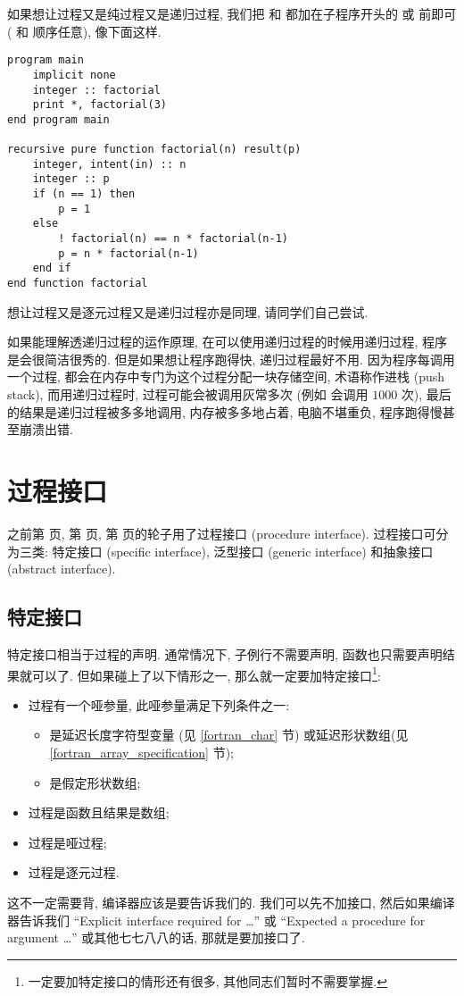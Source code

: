 如果想让过程又是纯过程又是递归过程, 我们把  和  都加在子程序开头的  或  前即可 ( 和  顺序任意), 像下面这样.
\begin{lstlisting}
program main
    implicit none
    integer :: factorial
    print *, factorial(3)
end program main

recursive pure function factorial(n) result(p)
    integer, intent(in) :: n
    integer :: p
    if (n == 1) then
        p = 1
    else
        ! factorial(n) == n * factorial(n-1)
        p = n * factorial(n-1)
    end if
end function factorial
\end{lstlisting}
想让过程又是逐元过程又是递归过程亦是同理, 请同学们自己尝试.

如果能理解透递归过程的运作原理, 在可以使用递归过程的时候用递归过程, 程序是会很简洁很秀的. 但是如果想让程序跑得快, 递归过程最好不用. 因为程序每调用一个过程, 都会在内存中专门为这个过程分配一块存储空间, 术语称作进栈 (push stack), 而用递归过程时, 过程可能会被调用灰常多次 (例如  会调用  $1000$ 次), 最后的结果是递归过程被多多地调用, 内存被多多地占着, 电脑不堪重负, 程序跑得慢甚至崩溃出错.

\section{过程接口} \label{fortran_interface} 

之前第 \pageref{assumed-shape_array_program} 页, 第 \pageref{dummy_procedure_program} 页, 第 \pageref{elemental_procedure_program} 页的轮子用了过程接口 (procedure interface). 过程接口可分为三类: 特定接口 (specific interface), 泛型接口 (generic interface) 和抽象接口 (abstract interface). 

\subsection{特定接口} 

特定接口相当于过程的声明. 通常情况下, 子例行不需要声明, 函数也只需要声明结果就可以了. 但如果碰上了以下情形之一, 那么就一定要加特定接口\footnote{一定要加特定接口的情形还有很多, 其他同志们暂时不需要掌握.}:\label{whether_specific_interface}
\begin{itemize} 
    \item 过程有一个哑参量, 此哑参量满足下列条件之一: \begin{itemize} 
        \item 是延迟长度字符型变量 (见 \ref{fortran_char} 节) 或延迟形状数组(见\ref{fortran_array_specification} 节);
        \item 是假定形状数组;
    \end{itemize} 
    \item 过程是函数且结果是数组;
    \item 过程是哑过程;
    \item 过程是逐元过程.
\end{itemize} 
这不一定需要背, 编译器应该是要告诉我们的. 我们可以先不加接口, 然后如果编译器告诉我们 ``Explicit interface required for \dots{}'' 或 ``Expected a procedure for argument \dots{}'' 或其他七七八八的话, 那就是要加接口了. 

